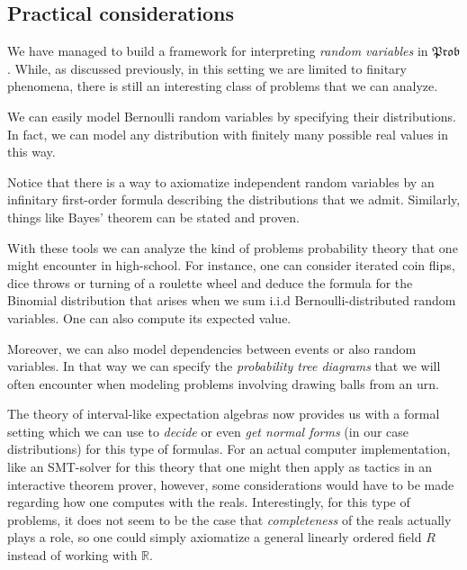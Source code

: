 \documentclass[a4paper]{amsproc}
\theoremstyle{plain}
\theoremstyle{definition}
\theoremstyle{remark}
\numberwithin{equation}{section}
\newcommand{\Prob}{\mathfrak{Prob}}
\begin{document}
\subsection{Practical considerations}

We have managed to build a framework for interpreting \emph{random variables} in $\Prob$. While, as discussed previously, in this setting we are limited to finitary phenomena, there is still an interesting class of problems that we can analyze.

We can easily model Bernoulli random variables by specifying their distributions. In fact, we can model any distribution with finitely many possible real values in this way.

Notice that there is a way to axiomatize independent random variables by an infinitary first-order formula describing the distributions that we admit. Similarly, things like Bayes' theorem can be stated and proven.

With these tools we can analyze the kind of problems probability theory that one might encounter in high-school. For instance, one can consider iterated coin flips, dice throws or turning of a roulette wheel and deduce the formula for the Binomial distribution that arises when we sum i.i.d Bernoulli-distributed random variables. One can also compute its expected value.

Moreover, we can also model dependencies between events or also random variables. In that way we can specify the \emph{probability tree diagrams} that we will often encounter when modeling problems involving drawing balls from an urn.

The theory of interval-like expectation algebras now provides us with a formal setting which we can use to \emph{decide} or even \emph{get normal forms} (in our case distributions) for this type of formulas. For an actual computer implementation, like an SMT-solver for this theory that one might then apply as tactics in an interactive theorem prover, however, some considerations would have to be made regarding how one computes with the reals. Interestingly, for this type of problems, it does not seem to be the case that \emph{completeness} of the reals actually plays a role, so one could simply axiomatize a general linearly ordered field $R$ instead of working with $\mathbb{R}$.



\end{document}
